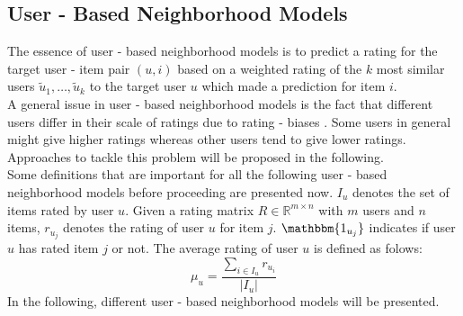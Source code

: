 \subsection{User - Based Neighborhood Models}
The essence of user - based neighborhood models is to predict a rating for the target user - item pair $(u,i)$ based on a weighted rating of the $k$ most similar users $\tilde{u}_1, \dots ,\tilde{u}_k$ to the target user $u$ which made a prediction for item $i$. \\ 
A general issue in user - based neighborhood models is the fact that different users differ in their scale of ratings due to rating - biases \cite{wherry1982control}. Some users in general might give higher ratings whereas other users tend to give lower ratings. Approaches to tackle this problem will be proposed in the following.\\
Some definitions that are important for all the following user - based neighborhood models before proceeding are presented now.
$I_u$ denotes the set of items rated by user $u$. Given a rating matrix $R \in \mathbb{R}^{m \times n}$ with $m$ users and $n$ items, $r_u_j$ denotes the rating of user $u$ for item $j$. $\mathbbm{1_{u_j}}$ indicates if user $u$ has rated item $j$ or not. The average rating of user $u$ is defined as folows:
    \begin{equation}
    \mu_u = \frac{\sum\limits_{i \in I_u}r_u_i}{|I_u|}
    \end{equation}
In the following, different user - based neighborhood models will be presented.

